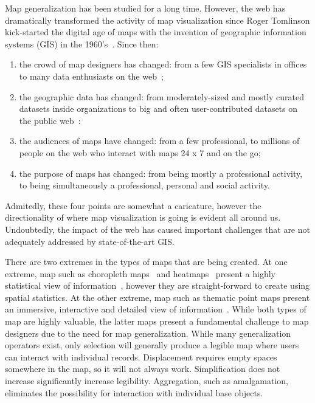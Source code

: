 \documentclass[11pt, oneside]{report}
\begin{document}
Map generalization has been studied for a long time. However, the web has dramatically transformed the activity of map visualization since Roger Tomlinson kick-started the digital age of maps with the invention of geographic information systems (GIS) in the 1960's~\cite{ucgis2014tomlinson}. Since then:

\begin{enumerate}
\item the crowd of map designers has changed: from a few GIS specialists in offices to many data enthusiasts on the web~\cite{hanrahan2012enthusiast};
\item the geographic data has changed: from moderately-sized and mostly curated datasets inside organizations to big and often user-contributed datasets on the public web~\cite{gst2014digitalmapsupply, openstreetmap, zooniverse2014oldweather}:
\item the audiences of maps have changed: from a few professional, to millions of people on the web who interact with maps 24 x 7 and on the go;
\item the purpose of maps has changed: from being mostly a professional activity, to being simultaneously a professional, personal and social activity. 
\end{enumerate}

Admitedly, these four points are somewhat a caricature, however the directionality of where map visualization is going is evident all around us. Undoubtedly, the impact of the web has caused important challenges that are not adequately addressed by state-of-the-art GIS. 

There are two extremes in the types of maps that are being created. At one extreme, map such as choropleth maps~\cite{jenks1963generalization} and heatmaps~\cite{wiki2014heatmap} present a highly statistical view of information~\cite{guardian2013ananas}, however they are straight-forward to create using spatial statistics. At the other extreme, map such as thematic point maps present an immersive, interactive and detailed view of information~\cite{nytimes2010iraq}. While both types of map are highly valuable, the latter maps present a fundamental challenge to map designers due to the need for map generalization. While many generalization operators exist, only selection will generally produce a legible map where users can interact with individual records. Displacement requires empty spaces somewhere in the map, so it will not always work. Simplification does not increase significantly increase legibility. Aggregation, such as amalgamation, eliminates the possibility for interaction with individual base objects.
\end{document}

